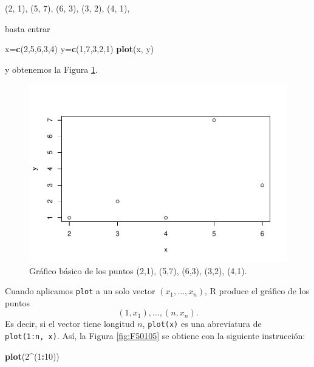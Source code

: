 \documentclass[
]{book}
\newenvironment{Shaded}{\begin{snugshade}}{\end{snugshade}}
\newcommand{\DecValTok}[1]{\textcolor[rgb]{0.00,0.00,0.81}{#1}}
\newcommand{\KeywordTok}[1]{\textcolor[rgb]{0.13,0.29,0.53}{\textbf{#1}}}
\newcommand{\NormalTok}[1]{#1}
\newcommand{\OperatorTok}[1]{\textcolor[rgb]{0.81,0.36,0.00}{\textbf{#1}}}
\theoremstyle{definition}
\theoremstyle{definition}
\theoremstyle{definition}
\theoremstyle{remark}
\begin{document}
(2, 1), (5, 7), (6, 3), (3, 2), (4, 1),

basta entrar

\begin{Shaded}
\begin{Highlighting}[]
\NormalTok{x=}\KeywordTok{c}\NormalTok{(}\DecValTok{2}\NormalTok{,}\DecValTok{5}\NormalTok{,}\DecValTok{6}\NormalTok{,}\DecValTok{3}\NormalTok{,}\DecValTok{4}\NormalTok{)}
\NormalTok{y=}\KeywordTok{c}\NormalTok{(}\DecValTok{1}\NormalTok{,}\DecValTok{7}\NormalTok{,}\DecValTok{3}\NormalTok{,}\DecValTok{2}\NormalTok{,}\DecValTok{1}\NormalTok{)}
\KeywordTok{plot}\NormalTok{(x, y)}
\end{Highlighting}
\end{Shaded}

y obtenemos la Figura \ref{fig:F501}.

\begin{figure}

{\centering \includegraphics[width=0.9\linewidth]{07chap06_Graficos_I_files/figure-latex/F501-1} 

}

\caption{Gráfico básico de los puntos (2,1), (5,7), (6,3), (3,2), (4,1).}\label{fig:F501}
\end{figure}

Cuando aplicamos \texttt{plot} a un solo vector \((x_1, \ldots, x_n)\), R produce el gráfico de los puntos
\[
(1, x_1), \ldots, (n, x_n).
\]
Es decir, si el vector tiene longitud \(n\), \texttt{plot(x)} es una abreviatura de \texttt{plot(1:n,\ x)}. Así, la Figura \ref{fig:F50105} se obtiene con la siguiente instrucción:

\begin{Shaded}
\begin{Highlighting}[]
\KeywordTok{plot}\NormalTok{(}\DecValTok{2}\OperatorTok{\^{}}\NormalTok{(}\DecValTok{1}\OperatorTok{:}\DecValTok{10}\NormalTok{))}
\end{Highlighting}
\end{Shaded}
\end{document}
